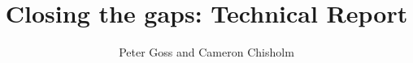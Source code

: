 \documentclass{grattan}
\title{Closing the gaps: Technical Report}
\author{Peter Goss and Cameron Chisholm}
\begin{document}
\raggedbottom
\raggedright
\let\oldfootnote\footnote
\renewcommand\footnote[1]{%
\oldfootnote{\hspace{1.5mm}#1}}

\contentspage

\begin{appendix}










\end{appendix}

\printbibliography
\end{document}
